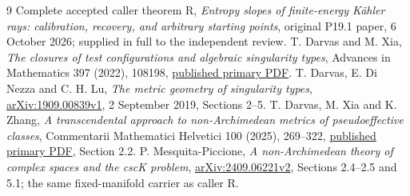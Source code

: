 \documentclass[11pt]{article}
\begin{document}
\begin{thebibliography}{9}
 Complete accepted caller theorem R,
\emph{Entropy slopes of finite-energy K\"ahler rays: calibration,
recovery, and arbitrary starting points}, original P19.1 paper,
6 October 2026; supplied in full to the independent review.
 T. Darvas and M. Xia, \emph{The closures of test
configurations and algebraic singularity types}, Advances in
Mathematics 397 (2022), 108198,
\href{https://research.chalmers.se/publication/528300/file/528300_Fulltext.pdf}{published primary PDF}.
 T. Darvas, E. Di Nezza and C. H. Lu,
\emph{The metric geometry of singularity types},
\href{https://arxiv.org/pdf/1909.00839v1}{arXiv:1909.00839v1},
2 September 2019, Sections 2--5.
 T. Darvas, M. Xia and K. Zhang,
\emph{A transcendental approach to non-Archimedean metrics of
pseudoeffective classes}, Commentarii Mathematici Helvetici 100
(2025), 269--322,
\href{https://ems.press/content/serial-article-files/49836}{published primary PDF}, Section 2.2.
 P. Mesquita-Piccione,
\emph{A non-Archimedean theory of complex spaces and the cscK problem},
\href{https://arxiv.org/pdf/2409.06221v2}{arXiv:2409.06221v2},
Sections 2.4--2.5 and 5.1; the same fixed-manifold carrier as caller R.
\end{thebibliography}
\end{document}
